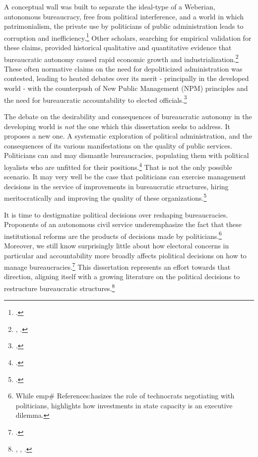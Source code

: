 \documentclass[12pt,]{book}
\let\rmarkdownfootnote\footnote%
\def\footnote{\protect\rmarkdownfootnote}
\begin{document}
A conceptual wall was built to separate the ideal-type of a Weberian, autonomous bureaucracy, free from political interference, and a world in which patrimonialism, the private use by politicians of public administration leads to corruption and inefficiency.\footnote{\citet{grindle_jobs_2012}.} Other scholars, searching for empirical validation for these claims, provided historical qualitative and quantitative evidence that bureaucratic autonomy caused rapid economic growth and industrialization.\footnote{\citet{kohli_state-directed_2004}, \citet{evans_bureaucracy_1999}.} These often normative claims on the need for depoliticized administration was contested, leading to heated debates over its merit - principally in the developed world - with the counterpush of New Public Management (NPM) principles and the need for bureaucratic accountability to elected officials.\footnote{\citet{osborne_banishing_1997}.}

The debate on the desirability and consequences of bureaucratic autonomy in the developing world is \emph{not} the one which this dissertation seeks to address. It proposes a new one. A systematic exploration of political administration, and the consequences of its various manifestations on the quality of public services. Politicians can and may dismantle bureaucracies, populating them with political loyalists who are unfitted for their positions.\footnote{\citet{suleiman_dismantling_2013}.} That is not the only possible scenario. It may very well be the case that politicians can exercise management decisions in the service of improvements in bureaucratic structures, hiring meritocratically and improving the quality of these organizations.\footnote{\citet{grindle_good_2004}.}

It is time to destigmatize political decisions over reshaping bureaucracies. Proponents of an autonomous civil service underemphasize the fact that these institutional reforms are the products of decisions made by politicians.\footnote{While \citet{grindle_jobs_2012} emp\# References:hasizes the role of technocrats negotiating with politicians, \citet{geddes_politicians_1994} highlights how investments in state capacity is an executive dilemma.} Moreover, we still know surprisingly little about how electoral concerns in particular and accountability more broadly affects piolitical decisions on how to manage bureaucracies.\footnote{\citet{gulzar_politicians_2017}.} This dissertation represents an effort towards that direction, aligning itself with a growing literature on the political decisions to restructure bureaucratic structures.\footnote{\citet{raffler_does_2016}, \citet{brollo_victor_2017}, \citet{colonnelli_patronage_2017}.}
\end{document}
